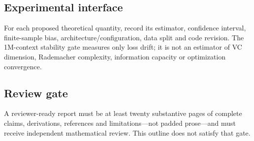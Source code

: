 \subsection{Experimental interface}
For each proposed theoretical quantity, record its estimator, confidence
interval, finite-sample bias, architecture/configuration, data split and code
revision. The 1M-context stability gate measures only loss drift; it is not an
estimator of VC dimension, Rademacher complexity, information capacity or
optimization convergence.

\subsection{Review gate}
A reviewer-ready report must be at least twenty substantive pages of complete
claims, derivations, references and limitations---not padded prose---and must
receive independent mathematical review. This outline does not satisfy that
gate.
